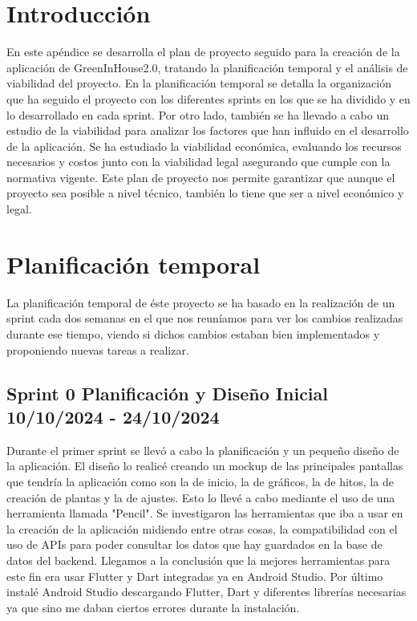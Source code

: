 
\section{Introducción}
En este apéndice se desarrolla el plan de proyecto seguido para la creación de la aplicación de GreenInHouse2.0, tratando la planificación temporal y el análisis de viabilidad del proyecto. 
En la planificación temporal se detalla la organización que ha seguido el proyecto con los diferentes sprints en los que se ha dividido y en lo desarrollado en cada sprint.
Por otro lado, también se ha llevado a cabo un estudio de la viabilidad para analizar los factores que han influido en el desarrollo de la aplicación. Se ha estudiado la viabilidad económica, evaluando los recursos necesarios y costos junto con la viabilidad legal asegurando que cumple con la normativa vigente.
Este plan de proyecto nos permite garantizar que aunque el proyecto sea posible a nivel técnico, también lo tiene que ser a nivel económico y legal.

\section{Planificación temporal}
La planificación temporal de éste proyecto se ha basado en la realización de un sprint cada dos semanas en el que nos reuníamos para ver los cambios realizadas durante ese tiempo, viendo si dichos cambios estaban bien implementados y proponiendo nuevas tareas a realizar.

\subsection{Sprint 0 Planificación y Diseño Inicial 10/10/2024 - 24/10/2024}
Durante el primer sprint se llevó a cabo la planificación y un pequeño diseño de la aplicación. El diseño lo realicé creando un mockup de las principales pantallas que tendría la aplicación como son la de inicio, la de gráficos, la de hitos, la de creación de plantas y la de ajustes. Esto lo llevé a cabo mediante el uso de una herramienta llamada "Pencil".
Se investigaron las herramientas que iba a usar en la creación de la aplicación midiendo entre otras cosas, la compatibilidad con el uso de APIs para poder consultar los datos que hay guardados en la base de datos del backend. Llegamos a la conclusión que la mejores herramientas para este fin era usar Flutter y Dart integradas ya en Android Studio. 
Por último instalé Android Studio descargando Flutter, Dart y diferentes librerías necesarias ya que sino me daban ciertos errores durante la instalación.


